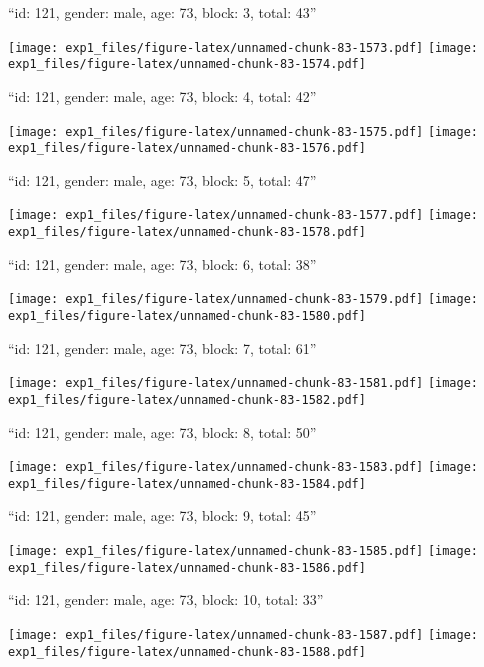 \documentclass[11pt,,]{article}
\begin{document}
\newpage
[1] 

``id: 121, gender: male, age: 73, block: 3, total: 43''

\texttt{[image: exp1\_files/figure-latex/unnamed-chunk-83-1573.pdf]}
\texttt{[image: exp1\_files/figure-latex/unnamed-chunk-83-1574.pdf]}

\newpage
[1] 

``id: 121, gender: male, age: 73, block: 4, total: 42''

\texttt{[image: exp1\_files/figure-latex/unnamed-chunk-83-1575.pdf]}
\texttt{[image: exp1\_files/figure-latex/unnamed-chunk-83-1576.pdf]}

\newpage
[1] 

``id: 121, gender: male, age: 73, block: 5, total: 47''

\texttt{[image: exp1\_files/figure-latex/unnamed-chunk-83-1577.pdf]}
\texttt{[image: exp1\_files/figure-latex/unnamed-chunk-83-1578.pdf]}

\newpage
[1] 

``id: 121, gender: male, age: 73, block: 6, total: 38''

\texttt{[image: exp1\_files/figure-latex/unnamed-chunk-83-1579.pdf]}
\texttt{[image: exp1\_files/figure-latex/unnamed-chunk-83-1580.pdf]}

\newpage
[1] 

``id: 121, gender: male, age: 73, block: 7, total: 61''

\texttt{[image: exp1\_files/figure-latex/unnamed-chunk-83-1581.pdf]}
\texttt{[image: exp1\_files/figure-latex/unnamed-chunk-83-1582.pdf]}

\newpage
[1] 

``id: 121, gender: male, age: 73, block: 8, total: 50''

\texttt{[image: exp1\_files/figure-latex/unnamed-chunk-83-1583.pdf]}
\texttt{[image: exp1\_files/figure-latex/unnamed-chunk-83-1584.pdf]}

\newpage
[1] 

``id: 121, gender: male, age: 73, block: 9, total: 45''

\texttt{[image: exp1\_files/figure-latex/unnamed-chunk-83-1585.pdf]}
\texttt{[image: exp1\_files/figure-latex/unnamed-chunk-83-1586.pdf]}

\newpage
[1] 

``id: 121, gender: male, age: 73, block: 10, total: 33''

\texttt{[image: exp1\_files/figure-latex/unnamed-chunk-83-1587.pdf]}
\texttt{[image: exp1\_files/figure-latex/unnamed-chunk-83-1588.pdf]}
\end{document}
